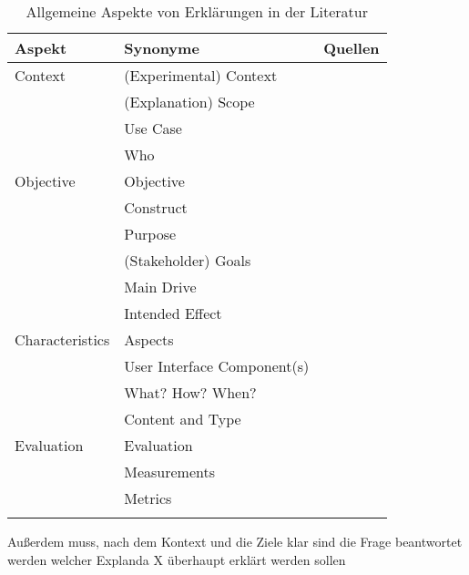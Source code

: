 \begin{longtable}{|p{}|p{}|p{}|}
    \hline
    \textbf{Aspekt}          & \textbf{Synonyme} & \textbf{Quellen} \\ \hline
    Context         & (Experimental) Context & \cite{chazette_knowledge_nodate} \cite{chazette_end-users_nodate} \cite{sato_context_nodate} \cite{waa_evaluating_2021} \cite{kohl_explainability_2019} \cite{neerincx_using_2018} \cite{sovrano_modelling_2020} \cite{doshi2017towards} \\
                    & (Explanation) Scope & \cite{wohlin2012experimentation} \cite{eiband_impact_2019} \cite{doshi2017towards} \\
                    & Use Case & \cite{waa_evaluating_2021} \\
                    & Who & \cite{rosenfeld_explainability_2019} \\
    \hline
    Objective       & Objective & \cite{nunes_systematic_2017} \\
                    & Construct & \cite{waa_evaluating_2021} \\
                    & Purpose & \cite{nunes_systematic_2017} \cite{wohlin2012experimentation} \\
                    & (Stakeholder) Goals & \cite{cirqueira_scenario-based_2020} \cite{sovrano_modelling_2020} \cite{ribera2019can} \\
                    & Main Drive & \cite{anjomshoae2019explainable} \\
                    & Intended Effect & \cite{balog_measuring_2020} \\
    \hline
    Characteristics & Aspects       & \cite{rosenfeld_explainability_2019} \\
                    & User Interface Component(s) & \cite{nunes_systematic_2017} \cite{rosenfeld_explainability_2019} \\
                    & What? How? When? & \cite{rosenfeld_explainability_2019} \\
                    & Content and Type & \cite{ribera2019can} \\
    \hline
    Evaluation      & Evaluation    & \cite{kohl_explainability_2019} \cite{doshi2017towards} \\
                    & Measurements  & \cite{waa_evaluating_2021} \cite{balog_measuring_2020} \\
                    & Metrics       & \cite{nunes_systematic_2017} \cite{anjomshoae2019explainable} \cite{chari_explanation_2020} \cite{waa_evaluating_2021}\\
    \hline
\caption{Allgemeine Aspekte von Erklärungen in der Literatur}
\label{tab:model_explaination_aspects}
\end{longtable}

Außerdem muss, nach dem Kontext und die Ziele klar sind die Frage beantwortet werden welcher Explanda X überhaupt erklärt werden sollen \cite{kohl_explainability_2019}